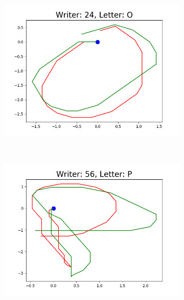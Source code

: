 \begin{figure}
\begin{subfigure}[b]{0.17\textwidth}
          \includegraphics[width=\textwidth]{images/framework/comparison_figures/O_24.png}
      \end{subfigure}
      ~
      \begin{subfigure}[b]{0.17\textwidth}
          \includegraphics[width=\textwidth]{images/framework/comparison_figures/P_56.png}
      \end{subfigure}
      ~
      \begin{subfigure}[b]{0.17\textwidth}

\end{subfigure}
\end{figure}

